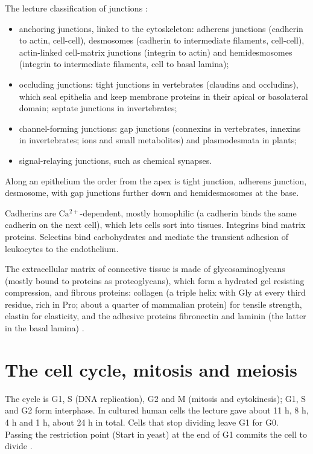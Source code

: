 The lecture classification of junctions
\cite[Chapter 20]{alberts2014essential}:
\begin{itemize}
\item anchoring junctions, linked to the
cytoskeleton: adherens junctions (cadherin to
actin, cell-cell), desmosomes (cadherin to
intermediate filaments, cell-cell),
actin-linked cell-matrix junctions (integrin
to actin) and hemidesmosomes (integrin to
intermediate filaments, cell to basal
lamina);
\item occluding junctions: tight junctions in
vertebrates (claudins and occludins), which
seal epithelia and keep membrane proteins in
their apical or basolateral domain; septate
junctions in invertebrates;
\item channel-forming junctions: gap
junctions (connexins in vertebrates, innexins
in invertebrates; ions and small metabolites)
and plasmodesmata in plants;
\item signal-relaying junctions, such as
chemical synapses.
\end{itemize}
Along an epithelium the order from the apex
is tight junction, adherens junction,
desmosome, with gap junctions further down
and hemidesmosomes at the base.

Cadherins are $\mathrm{Ca^{2+}}$-dependent,
mostly homophilic (a cadherin binds the same
cadherin on the next cell), which lets cells
sort into tissues. Integrins bind matrix
proteins. Selectins bind carbohydrates and
mediate the transient adhesion of leukocytes
to the endothelium.

The extracellular matrix of connective tissue
is made of glycosaminoglycans (mostly bound
to proteins as proteoglycans), which form a
hydrated gel resisting compression, and
fibrous proteins: collagen (a triple helix
with Gly at every third residue, rich in Pro;
about a quarter of mammalian protein) for
tensile strength, elastin for elasticity, and
the adhesive proteins fibronectin and laminin
(the latter in the basal lamina)
\cite[Chapter 20]{alberts2014essential}.

\section{The cell cycle, mitosis and meiosis}
\label{section-mcb-cell-cycle}

The cycle is G1, S (DNA replication), G2 and
M (mitosis and cytokinesis); G1, S and G2
form interphase. In cultured human cells the
lecture gave about 11 h, 8 h, 4 h and 1 h,
about 24 h in total. Cells that stop dividing
leave G1 for G0. Passing the restriction
point (Start in yeast) at the end of G1
commits the cell to divide \cite[Chapter
18]{alberts2014essential}.

